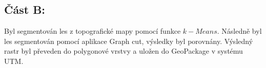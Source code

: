\subsection*{Část B:}
Byl segmentován les z topografické mapy pomocí funkce $k-Means$. Následně byl les segmentován pomocí aplikace Graph cut, výsledky byl porovnány. Výsledný rastr byl převeden do polygonové vrstvy a uložen do GeoPackage v systému UTM.